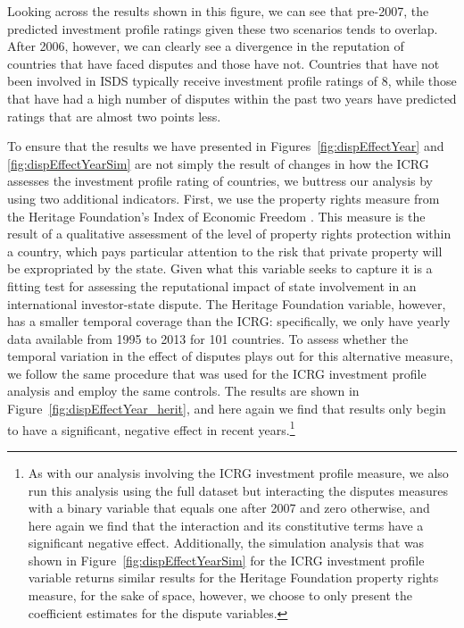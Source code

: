 \documentclass[12pt,onesided]{amsart}
\begin{document}
Looking across the results shown in this figure, we can see that pre-2007, the predicted investment profile ratings given these two scenarios tends to overlap. After 2006, however, we can clearly see a divergence in the reputation of countries that have faced disputes and those have not. Countries that have not been involved in ISDS typically receive investment profile ratings of 8, while those that have had a high number of disputes within the past two years have predicted ratings that are almost two points less. 

To ensure that the results we have presented in Figures~\ref{fig:dispEffectYear} and \ref{fig:dispEffectYearSim} are not simply the result of changes in how the ICRG assesses the investment profile rating of countries, we buttress our analysis by using two additional indicators. First, we use the property rights measure from the Heritage Foundation's Index of Economic Freedom \citep{miles:etal:2004}. This measure is the result of a qualitative assessment of the level of property rights protection within a country, which pays particular attention to the risk that private property will be expropriated by the state. Given what this variable seeks to capture it is a fitting test for assessing the reputational impact of state involvement in an international investor-state dispute. The Heritage Foundation variable, however, has a smaller temporal coverage than the ICRG: specifically, we only have yearly data available from 1995 to 2013 for 101 countries. To assess whether the temporal variation in the effect of disputes plays out for this alternative measure, we follow the same procedure that was used for the ICRG investment profile analysis and employ the same controls. The results are shown in Figure~\ref{fig:dispEffectYear_herit}, and here again we find that results only begin to have a significant, negative effect in recent years.\footnote{As with our analysis involving the ICRG investment profile measure, we also run this analysis using the full dataset but interacting the disputes measures with a binary variable that equals one after 2007 and zero otherwise, and here again we find that the interaction and its constitutive terms have a significant negative effect. Additionally, the simulation analysis that was shown in Figure~\ref{fig:dispEffectYearSim} for the ICRG investment profile variable returns similar results for the Heritage Foundation property rights measure, for the sake of space, however, we choose to only present the coefficient estimates for the dispute variables.} 
\end{document}
